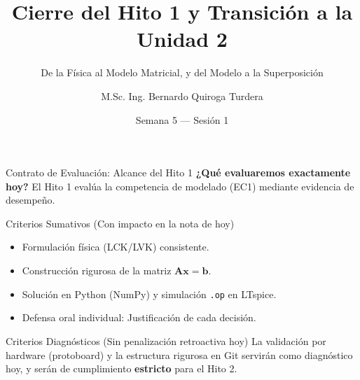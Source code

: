 \documentclass[aspectratio=169, 10pt]{beamer}
\title[Calibración Hito 1 y Linealidad]{Cierre del Hito 1 y Transición a la Unidad 2}
\subtitle{De la Física al Modelo Matricial, y del Modelo a la Superposición}
\author[M.Sc. Ing. B. Quiroga]{M.Sc. Ing. Bernardo Quiroga Turdera}
\institute[UCB Tarija]{IMT-121 Circuitos Electrónicos I}
\date{Semana 5 — Sesión 1}
\begin{document}
\begin{frame}
    \titlepage
\end{frame}

\begin{frame}{Contrato de Evaluación: Alcance del Hito 1}
    \textbf{¿Qué evaluaremos exactamente hoy?}
    El Hito 1 evalúa la competencia de modelado (EC1) mediante evidencia de desempeño.
    \begin{block}{Criterios Sumativos (Con impacto en la nota de hoy)}
        \begin{itemize}
            \item Formulación física (LCK/LVK) consistente.
            \item Construcción rigurosa de la matriz $\mathbf{A}\mathbf{x}=\mathbf{b}$.
            \item Solución en Python (NumPy) y simulación \texttt{.op} en LTspice.
            \item Defensa oral individual: Justificación de cada decisión.
        \end{itemize}
    \end{block}
    
    \begin{alertblock}{Criterios Diagnósticos (Sin penalización retroactiva hoy)}
        La validación por hardware (protoboard) y la estructura rigurosa en Git servirán como diagnóstico hoy, y serán de cumplimiento \textbf{estricto} para el Hito 2.
    \end{alertblock}
\end{frame}
\end{document}
